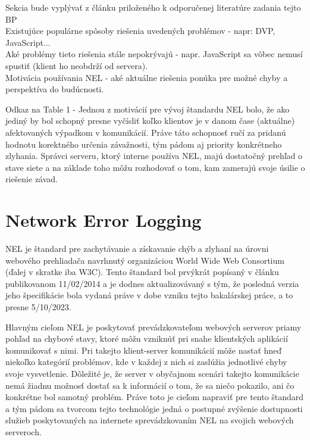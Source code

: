 Sekcia bude vyplývať z článku priloženého k odporučenej literatúre zadania tejto BP \cite{nel-client-side-measurement-e2e-reliability}
\\
Existujúce populárne spôsoby riešenia uvedených problémov - napr: DVP, JavaScript...
\\
Aké problémy tieto riešenia stále nepokrývajú - napr. JavaScript sa vôbec nemusí spustiť (klient ho neobdrží od servera).
\\
Motivácia používania NEL - aké aktuálne riešenia ponúka pre možné chyby a perspektíva do budúcnosti.


Odkaz na Table 1 - Jednou z motivácií pre vývoj štandardu NEL bolo, že ako jediný by bol schopný presne vyčísliť koľko klientov je
v danom čase (aktuálne) afektovaných výpadkom v komunikácií. Práve táto schopnosť ručí za pridanú hodnotu korektného určenia závažnosti,
tým pádom aj priority konkrétneho zlyhania. Správci serveru, ktorý interne používa NEL, majú dostatočný prehľad o stave siete a na základe 
toho môžu rozhodovať o tom, kam zamerajú svoje úsilie o riešenie závad.    

\section{Network Error Logging}


NEL je štandard pre zachytávanie a získavanie chýb a zlyhaní na úrovni webového prehliadača navrhnutý organizáciou World Wide Web 
Consortium (ďalej v skratke iba W3C). Tento štandard bol prvýkrát popísaný v článku publikovanom 11/02/2014 a je dodnes aktualizovávaný
s tým, že posledná verzia jeho špecifikácie bola vydaná práve v dobe vzniku tejto bakalárskej práce, a to presne 5/10/2023. 

Hlavným cieľom NEL je poskytovať prevádzkovateľom webových serverov priamy pohľad na chybové stavy, ktoré môžu vzniknúť pri snahe 
klientských aplikácií komunikovať s nimi. Pri takejto klient-server komunikácií môže nastať hneď niekoľko kategórií problémov, 
kde v každej z nich si zaslúžia jednotlivé chyby svoje vysvetlenie. Dôležité je, že server v obyčajnom scenári takejto komunikácie 
nemá žiadnu možnosť dostať sa k informácií o tom, že sa niečo pokazilo, ani čo konkrétne bol samotný problém. Práve toto je cieľom 
napraviť pre tento štandard a tým pádom sa tvorcom tejto technológie jedná o postupné zvýšenie dostupnosti služieb poskytovaných 
na internete sprevádzkovaním NEL na svojich webových serveroch.

